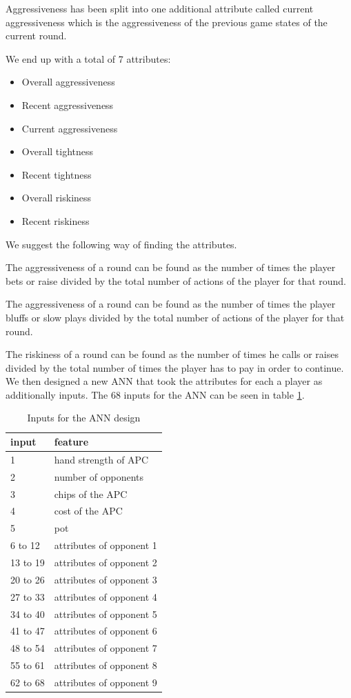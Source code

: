 Aggressiveness has been split into one additional attribute called current aggressiveness which is the aggressiveness of the previous game states of the current round.

We end up with a total of 7 attributes:
\begin{itemize}
\item Overall aggressiveness
\item Recent aggressiveness
\item Current aggressiveness
\item Overall tightness
\item Recent tightness
\item Overall riskiness
\item Recent riskiness
\end{itemize}

We suggest the following way of finding the attributes.

The aggressiveness of a round can be found as the number of times the player bets or raise divided by the total number of actions of the player for that round.

The aggressiveness of a round can be found as the number of times the player bluffs or slow plays divided by the total number of actions of the player for that round.

The riskiness of a round can be found as the number of times he calls or raises divided by the total number of times the player has to pay in order to continue.\\

We then designed a new ANN that took the attributes for each a player as additionally inputs. The 68 inputs for the ANN can be seen in table \ref{tab:ann-design-con}. 

\begin{table}
\center
\begin{tabular}{ | l | l | }
\hline
input & feature \\
\hline
1 & hand strength of APC\\
2 & number of opponents\\
3 & chips of the APC\\
4 & cost of the APC\\
5 & pot\\
6 to 12 & attributes of opponent 1\\
13 to 19 & attributes of opponent 2\\
20 to 26 & attributes of opponent 3\\
27 to 33 & attributes of opponent 4\\
34 to 40 & attributes of opponent 5\\
41 to 47 & attributes of opponent 6\\
48 to 54 & attributes of opponent 7\\
55 to 61 & attributes of opponent 8\\
62 to 68 & attributes of opponent 9\\
\hline
\end{tabular}
\caption{Inputs for the ANN design \label{tab:ann-design-con}}
\end{table}
